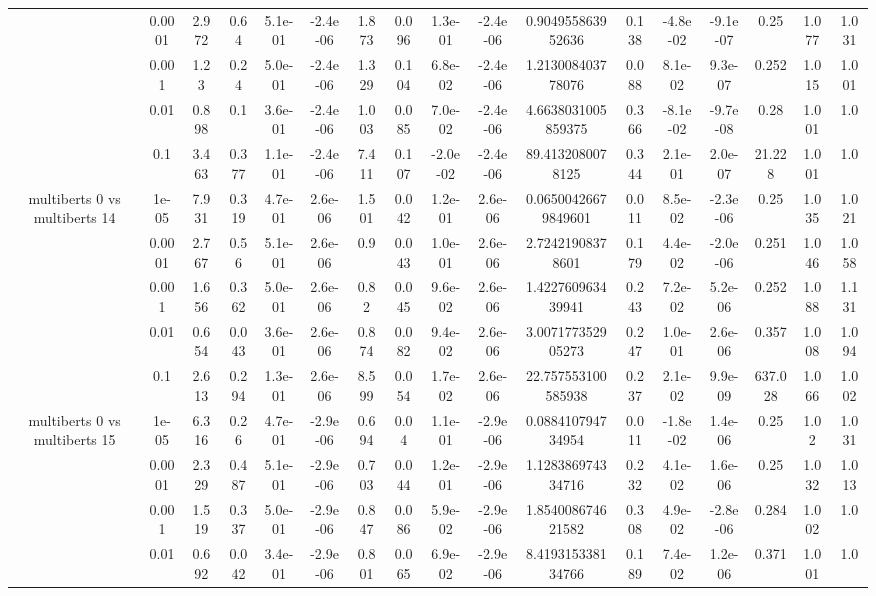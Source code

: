 \begin{tabular}{|c|c|c|c|c|c|c|c|c|c|c|c|c|c|c|c|c|}
 & 0.0001 & 2.972 & 0.64 & 5.1e-01 & -2.4e-06 & 1.873 & 0.096 & 1.3e-01 & -2.4e-06 & 0.904955863952636 & 0.138 & -4.8e-02 & -9.1e-07 & 0.25 & 1.077 & 1.031 \\
 & 0.001 & 1.23 & 0.24 & 5.0e-01 & -2.4e-06 & 1.329 & 0.104 & 6.8e-02 & -2.4e-06 & 1.213008403778076 & 0.088 & 8.1e-02 & 9.3e-07 & 0.252 & 1.015 & 1.001 \\
 & 0.01 & 0.898 & 0.1 & 3.6e-01 & -2.4e-06 & 1.003 & 0.085 & 7.0e-02 & -2.4e-06 & 4.6638031005859375 & 0.366 & -8.1e-02 & -9.7e-08 & 0.28 & 1.001 & 1.0 \\
 & 0.1 & 3.463 & 0.377 & 1.1e-01 & -2.4e-06 & 7.411 & 0.107 & -2.0e-02 & -2.4e-06 & 89.4132080078125 & 0.344 & 2.1e-01 & 2.0e-07 & 21.228 & 1.001 & 1.0 \\
\hline
\multirow{5}{*}{multiberts 0 vs multiberts 14} & 1e-05 & 7.931 & 0.319 & 4.7e-01 & 2.6e-06 & 1.501 & 0.042 & 1.2e-01 & 2.6e-06 & 0.06500426679849601 & 0.011 & 8.5e-02 & -2.3e-06 & 0.25 & 1.035 & 1.021 \\
 & 0.0001 & 2.767 & 0.56 & 5.1e-01 & 2.6e-06 & 0.9 & 0.043 & 1.0e-01 & 2.6e-06 & 2.72421908378601 & 0.179 & 4.4e-02 & -2.0e-06 & 0.251 & 1.046 & 1.058 \\
 & 0.001 & 1.656 & 0.362 & 5.0e-01 & 2.6e-06 & 0.82 & 0.045 & 9.6e-02 & 2.6e-06 & 1.422760963439941 & 0.243 & 7.2e-02 & 5.2e-06 & 0.252 & 1.088 & 1.131 \\
 & 0.01 & 0.654 & 0.043 & 3.6e-01 & 2.6e-06 & 0.874 & 0.082 & 9.4e-02 & 2.6e-06 & 3.007177352905273 & 0.247 & 1.0e-01 & 2.6e-06 & 0.357 & 1.008 & 1.094 \\
 & 0.1 & 2.613 & 0.294 & 1.3e-01 & 2.6e-06 & 8.599 & 0.054 & 1.7e-02 & 2.6e-06 & 22.757553100585938 & 0.237 & 2.1e-02 & 9.9e-09 & 637.028 & 1.066 & 1.002 \\
\hline
\multirow{5}{*}{multiberts 0 vs multiberts 15} & 1e-05 & 6.316 & 0.26 & 4.7e-01 & -2.9e-06 & 0.694 & 0.04 & 1.1e-01 & -2.9e-06 & 0.088410794734954 & 0.011 & -1.8e-02 & 1.4e-06 & 0.25 & 1.02 & 1.031 \\
 & 0.0001 & 2.329 & 0.487 & 5.1e-01 & -2.9e-06 & 0.703 & 0.044 & 1.2e-01 & -2.9e-06 & 1.128386974334716 & 0.232 & 4.1e-02 & 1.6e-06 & 0.25 & 1.032 & 1.013 \\
 & 0.001 & 1.519 & 0.337 & 5.0e-01 & -2.9e-06 & 0.847 & 0.086 & 5.9e-02 & -2.9e-06 & 1.854008674621582 & 0.308 & 4.9e-02 & -2.8e-06 & 0.284 & 1.002 & 1.0 \\
 & 0.01 & 0.692 & 0.042 & 3.4e-01 & -2.9e-06 & 0.801 & 0.065 & 6.9e-02 & -2.9e-06 & 8.419315338134766 & 0.189 & 7.4e-02 & 1.2e-06 & 0.371 & 1.001 & 1.0 \\

\end{tabular}
